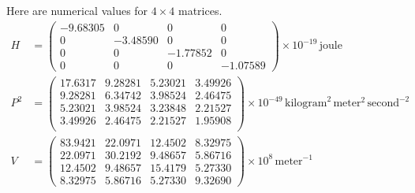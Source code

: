 \documentclass[12pt]{article}
\begin{document}
\noindent
Here are numerical values for $4\times4$ matrices.
\begin{align*}
H&=\begin{pmatrix}
-9.68305 & 0 & 0 & 0 \\[1ex]
0 & -3.48590 & 0 & 0 \\[1ex]
0 & 0 & -1.77852 & 0 \\[1ex]
0 & 0 & 0 & -1.07589
\end{pmatrix}\times10^{-19}\,\text{joule}
\\[2ex]
P^2&=\begin{pmatrix}
17.6317 & 9.28281 & 5.23021 & 3.49926 \\[1ex]
9.28281 & 6.34742 & 3.98524 & 2.46475 \\[1ex]
5.23021 & 3.98524 & 3.23848 & 2.21527 \\[1ex]
3.49926 & 2.46475 & 2.21527 & 1.95908 \\[1ex]
\end{pmatrix}\times10^{-49}\,\text{kilogram}^2\,\text{meter}^2\,\text{second}^{-2}
\\[2ex]
V&=\begin{pmatrix}
83.9421 & 22.0971 & 12.4502 & 8.32975 \\[1ex]
22.0971 & 30.2192 & 9.48657 & 5.86716 \\[1ex]
12.4502 & 9.48657 & 15.4179 & 5.27330 \\[1ex]
8.32975 & 5.86716 & 5.27330 & 9.32690
\end{pmatrix}\times10^8\,\text{meter}^{-1}
\end{align*}
\end{document}
